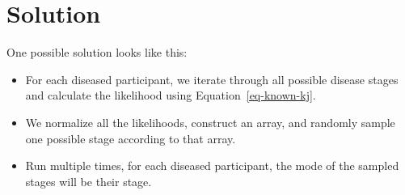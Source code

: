 \documentclass[
  letterpaper,
  DIV=11,
  numbers=noendperiod]{scrreprt}
\begin{document}
\section{Solution}\label{solution}

One possible solution looks like this:

\begin{itemize}
\item
  For each diseased participant, we iterate through all possible disease
  stages and calculate the likelihood using Equation~\ref{eq-known-kj}.
\item
  We normalize all the likelihoods, construct an array, and randomly
  sample one possible stage according to that array.
\item
  Run multiple times, for each diseased participant, the mode of the
  sampled stages will be their stage.
\end{itemize}
\end{document}
